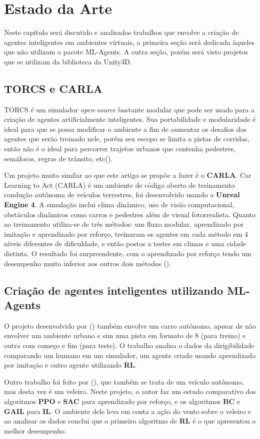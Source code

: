 \chapter{Estado da Arte}\label{cap:estArte}
Neste capítulo será discutido e analisados trabalhos que envolve a criação de agentes inteligentes em ambientes virtuais, a primeira seção será dedicada àqueles que não utilizam o pacote ML-Agents. A outra seção, porém será visto projetos que se utilizam da biblioteca da Unity3D.

\section*{TORCS e CARLA}
TORCS é um simulador \textit{open-source} bastante modular que pode ser usado para a criação de agentes artificialmente inteligentes. Sua portabilidade e modularidade é ideal para que se possa modificar o ambiente a fim de aumentar os desafios dos agentes que serão treinado nele, porém seu escopo se limita a pistas de corridas, então não é o ideal para percorrer trajetos urbanos que contenha pedestres, semáforos, regras de trânsito, etc().

Um projeto muito similar ao que este artigo se propõe a fazer é o \textbf{CARLA}. Car Learning to Act (CARLA) é um ambiente de código aberto de treinamento condução autônoma de veículos terrestres, foi desenvolvido usando a \textbf{Unreal Engine 4}. A simulação inclui clima dinâmico, uso de visão computacional, obstáculos dinâmicos como carros e pedestres além de visual fotorrealista. Quanto ao treinamento utiliza-se de três métodos: um fluxo modular, aprendizado por imitação e aprendizado por reforço, treinaram os agentes em cada método em 4 níveis diferentes de dificuldade, e então postos a testes em climas e uma cidade distinta. O resultado foi surpreendente, com o aprendizado por reforço tendo um desempenho muito inferior aos outros dois métodos ().

\section*{Criação de agentes inteligentes utilizando ML-Agents}\label{sec:primTrab}
O projeto desenvolvido por () também envolve um carro autônomo, apesar de não envolver um ambiente urbano e sim uma pista em formato de 8 (para treino) e outra com começo e fim (para teste). O trabalho analisa o dados da dirigibilidade comparando um humano em um simulador, um agente criado usando aprendizado por imitação e outro agente utilizando \textbf{RL}. 

Outro trabalho foi feito por (), que também se trata de um veículo autônomo, mas desta vez é um veleiro. Neste projeto, o autor faz um estudo comparativo dos algoritmos \textbf{PPO} e \textbf{SAC} para aprendizado por reforço, e os algoritmos \textbf{BC} e \textbf{GAIL} para \textbf{IL}. O ambiente dele leva em conta a ação do vento sobre o veleiro e ao analisar os dados conclui que o primeiro algoritmo de \textbf{RL} é o que apresentou o melhor desempenho.